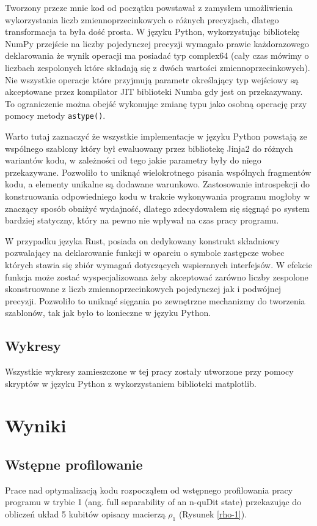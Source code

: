 \documentclass[11pt, a4paper]{article}
\newcommand{\code}[1]{\texttt{#1}}
\begin{document}
\begin{sloppypar}
    Tworzony przeze mnie kod od początku powstawał z zamysłem umożliwienia wykorzystania
    liczb zmiennoprzecinkowych o różnych precyzjach, dlatego transformacja ta była dość
    prosta. W języku Python, wykorzystując bibliotekę NumPy przejście na liczby
    pojedynczej precyzji wymagało prawie każdorazowego deklarowania że wynik operacji ma
    posiadać typ complex64 (cały czas mówimy o liczbach zespolonych które składają się z
    dwóch wartości zmiennoprzecinkowych). Nie wszystkie operacje które przyjmują parametr
    określający typ wejściowy są akceptowane przez kompilator JIT biblioteki Numba gdy jest
    on przekazywany. To ograniczenie można obejść wykonując zmianę typu jako osobną
    operację przy pomocy metody \code{astype()}.

    Warto tutaj zaznaczyć że wszystkie implementacje w języku Python powstają ze wspólnego
    szablony który był ewaluowany przez bibliotekę Jinja2 do różnych wariantów kodu, w
    zależności od tego jakie parametry były do niego przekazywane. Pozwoliło to uniknąć wielokrotnego
    pisania wspólnych fragmentów kodu, a elementy unikalne są dodawane warunkowo. Zastosowanie
    introspekcji do konstruowania odpowiedniego kodu w trakcie wykonywania programu mogłoby
    w znaczący sposób obniżyć wydajność, dlatego zdecydowałem się sięgnąć po system
    bardziej statyczny, który na pewno nie wpływał na czas pracy programu.

    W przypadku języka Rust, posiada on dedykowany konstrukt składniowy pozwalający na
    deklarowanie funkcji w oparciu o symbole zastępcze wobec których stawia się zbiór
    wymagań dotyczących wspieranych interfejsów. W efekcie funkcja może zostać wyspecjalizowana
    żeby akceptować zarówno liczby zespolone skonstruowane z liczb zmiennoprzecinkowych pojedynczej
    jak i podwójnej precyzji. Pozwoliło to uniknąć sięgania po zewnętrzne mechanizmy do
    tworzenia szablonów, tak jak było to konieczne w języku Python.

    \subsection{Wykresy}
    Wszystkie wykresy zamieszczone w tej pracy zostały utworzone przy pomocy skryptów w języku
    Python z wykorzystaniem biblioteki matplotlib\cite{Hunter:2007}.

    \section{Wyniki}
    \subsection{Wstępne profilowanie}
    Prace nad optymalizacją kodu rozpocząłem od wstępnego profilowania pracy programu w
    trybie 1 (ang. full separability of an n-quDit state) przekazując do obliczeń układ 5
    kubitów opisany macierzą $\rho_{1}$ (Rysunek \ref{rho-1}).


\end{sloppypar}
\end{document}

